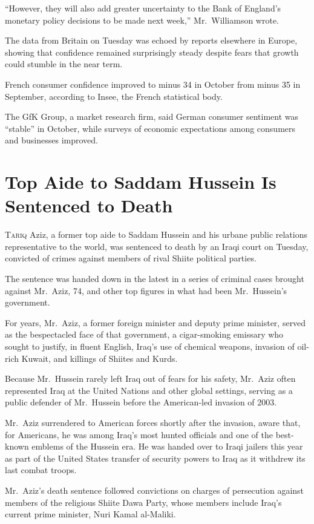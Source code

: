 ﻿\documentclass[12pt]{article}
\begin{document}
``However, they will also add greater uncertainty to the Bank of England's monetary policy decisions
to be made next week,'' Mr.~Williamson wrote.

The data from Britain on Tuesday was echoed by reports elsewhere in Europe, showing that confidence
remained surprisingly steady despite fears that growth could stumble in the near term.

French consumer confidence improved to minus 34 in October from minus 35 in September, according to
Insee, the French statistical body.

The GfK Group, a market research firm, said German consumer sentiment was ``stable'' in October,
while surveys of economic expectations among consumers and businesses improved.

\section{Top Aide to Saddam Hussein Is Sentenced to Death}

\lettrine{T}{ariq} Aziz, a former top aide to Saddam Hussein and his urbane
public relations representative to the world, was sentenced to death by an Iraqi court on Tuesday,
convicted of crimes against members of rival Shiite political parties.

The sentence was handed down in the latest in a series of criminal cases brought against Mr.~Aziz,
74, and other top figures in what had been Mr.~Hussein's government.

For years, Mr.~Aziz, a former foreign minister and deputy prime minister, served as the bespectacled
face of that government, a cigar-smoking emissary who sought to justify, in fluent English, Iraq's
use of chemical weapons, invasion of oil-rich Kuwait, and killings of Shiites and Kurds.

Because Mr.~Hussein rarely left Iraq out of fears for his safety, Mr.~Aziz often represented Iraq at
the United Nations and other global settings, serving as a public defender of Mr.~Hussein before the
American-led invasion of 2003.

Mr.~Aziz surrendered to American forces shortly after the invasion, aware that, for Americans, he
was among Iraq's most hunted officials and one of the best-known emblems of the Hussein era. He was
handed over to Iraqi jailers this year as part of the United States transfer of security powers to
Iraq as it withdrew its last combat troops.

Mr.~Aziz's death sentence followed convictions on charges of persecution against members of the
religious Shiite Dawa Party, whose members include Iraq's current prime minister, Nuri Kamal
al-Maliki.
\end{document}
